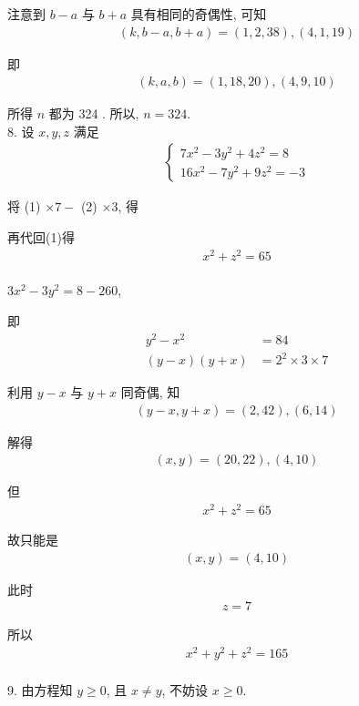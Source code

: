注意到 $b-a$ 与 $b+a$ 具有相同的奇偶性, 可知
\begin{align*}
	(k, b-a, b+a)=(1,2,38),(4,1,19)
\end{align*}

即
\begin{align*}
	(k, a, b)=(1,18,20),(4,9,10)
\end{align*}

所得 $n$ 都为 324 . 所以, $n=324$.\\
8. 设 $x, y, z$ 满足
\begin{align*}
	\left\{\begin{array}{l}
		       7 x^{2}-3 y^{2}+4 z^{2}=8 \\
		       16 x^{2}-7 y^{2}+9 z^{2}=-3
	       \end{array}\right.
\end{align*}

将 (1) $\times 7-$ (2) $\times 3$, 得

再代回(1)得
\begin{align*}
	x^{2}+z^{2}=65
\end{align*}\\
$3 x^{2}-3 y^{2}=8-260$,

即\begin{align}
	y^{2}-x^{2} & =84                      \\
	(y-x)(y+x)  & =2^{2} \times 3 \times 7
\end{align}

利用 $y-x$ 与 $y+x$ 同奇偶, 知
\begin{align*}
	(y-x, y+x)=(2,42),(6,14)
\end{align*}

解得
\begin{align*}
	(x, y)=(20,22),(4,10)
\end{align*}

但
\begin{align*}
	x^{2}+z^{2}=65
\end{align*}

故只能是
\begin{align*}
	(x, y)=(4,10)
\end{align*}

此时
\begin{align*}
	z=7
\end{align*}

所以
\begin{align*}
	x^{2}+y^{2}+z^{2}=165
\end{align*}\\
9. 由方程知 $y \geqslant 0$, 且 $x \neq y$, 不妨设 $x \geqslant 0$.

